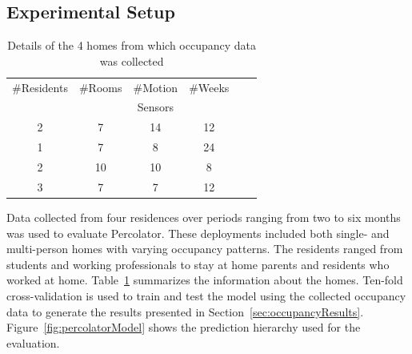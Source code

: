 
\subsection{Experimental Setup}
\label{sec:occupancyExperiment}


\begin{table}[!htb]
\centering
\begin{tabular}{|c|c|c|c|c|c|}
\hline
  \small \#Residents & \small \#Rooms & \small \#Motion & \small \#Weeks \\
  & & \small Sensors & \\
\hline
 \small 2 & \small 7 & \small 14 & \small 12 \\
 \small 1 & \small 7 & \small 8 & \small 24 \\
 \small 2 & \small 10 & \small 10 & \small 8 \\
 \small 3 & \small 7 & \small 7 & \small 12 \\
\hline
\end{tabular}
\caption{Details of the 4 homes from which occupancy data was collected}
\label{table:deploymentDetails}
\end{table}

Data collected from four residences over periods ranging from two to six months
was used to evaluate Percolator. These deployments included both single- and
multi-person homes with varying occupancy patterns. The residents ranged from
students and working professionals to stay at home parents and residents who
worked at home. Table~\ref{table:deploymentDetails} summarizes the information
about the homes. Ten-fold cross-validation is used to train and test the model
using the collected occupancy data to generate the results presented in
Section~\ref{sec:occupancyResults}.  Figure~\ref{fig:percolatorModel} shows the
prediction hierarchy used for the evaluation.

